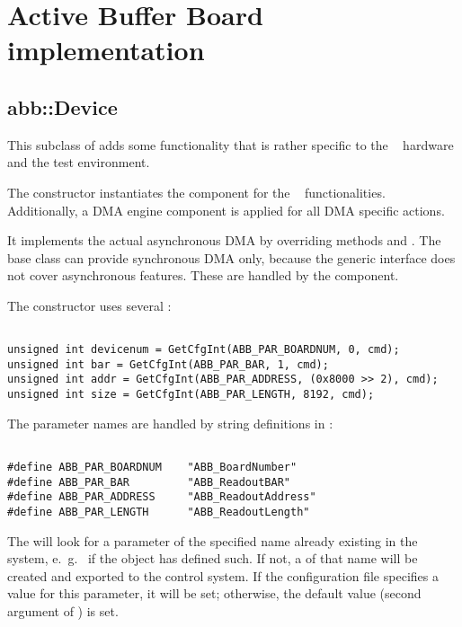 \section{Active Buffer Board implementation}
\subsection{abb::Device}
This subclass of  adds some functionality that is
rather specific to the \ABB~ hardware and the test environment.


\begin{compactenum} 

\item The constructor instantiates the  component for the
\ABB~ functionalities. Additionally, a DMA engine component
 is applied for all DMA specific actions.

\item It implements the actual asynchronous DMA by overriding 
methods  and .
The base class 
can provide synchronous DMA only, because
the generic  interface 
does not cover asynchronous features.
These are handled by the  component.

\item  The constructor uses several :
\begin{verbatim} 

unsigned int devicenum = GetCfgInt(ABB_PAR_BOARDNUM, 0, cmd);
unsigned int bar = GetCfgInt(ABB_PAR_BAR, 1, cmd);
unsigned int addr = GetCfgInt(ABB_PAR_ADDRESS, (0x8000 >> 2), cmd);
unsigned int size = GetCfgInt(ABB_PAR_LENGTH, 8192, cmd);

\end{verbatim}
The parameter names are handled by string definitions in 
:
\begin{verbatim}

#define ABB_PAR_BOARDNUM    "ABB_BoardNumber"
#define ABB_PAR_BAR         "ABB_ReadoutBAR"
#define ABB_PAR_ADDRESS     "ABB_ReadoutAddress"
#define ABB_PAR_LENGTH      "ABB_ReadoutLength"

\end{verbatim}

The  will look for a parameter of the specified name
already existing in the system, e.~g.~ if the  
object has defined such.
If not, a  of that name will be created and exported
to the control system. If the configuration file
specifies a value for this parameter, it will be set; otherwise, the
default value (second argument of ) is set.


\end{compactenum}
